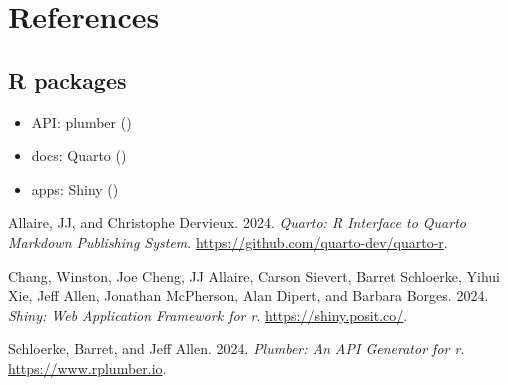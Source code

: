 \documentclass[
  letterpaper,
  DIV=11,
  numbers=noendperiod]{scrreprt}
\newlength{\cslhangindent}
\newenvironment{CSLReferences}[2] %
 {\begin{list}{}{%
  \setlength{\itemindent}{0pt}
  \setlength{\leftmargin}{0pt}
  \setlength{\parsep}{0pt}
  \ifodd #1
   \setlength{\leftmargin}{\cslhangindent}
   \setlength{\itemindent}{-1\cslhangindent}
  \fi
  \setlength{\itemsep}{#2\baselineskip}}}
 {\end{list}}
\providecommand{\tightlist}{%
  \setlength{\itemsep}{0pt}\setlength{\parskip}{0pt}}
\begin{document}

\chapter{References}\label{references}

\section{R packages}\label{r-packages}

\begin{itemize}
\tightlist
\item
  API: plumber ()
\item
  docs: Quarto ()
\item
  apps: Shiny ()
\end{itemize}

\label{refs}
\begin{CSLReferences}{1}{0}
Allaire, JJ, and Christophe Dervieux. 2024. \emph{Quarto: R Interface to
Quarto Markdown Publishing System}.
\url{https://github.com/quarto-dev/quarto-r}.

Chang, Winston, Joe Cheng, JJ Allaire, Carson Sievert, Barret Schloerke,
Yihui Xie, Jeff Allen, Jonathan McPherson, Alan Dipert, and Barbara
Borges. 2024. \emph{Shiny: Web Application Framework for r}.
\url{https://shiny.posit.co/}.

Schloerke, Barret, and Jeff Allen. 2024. \emph{Plumber: An API Generator
for r}. \url{https://www.rplumber.io}.

\end{CSLReferences}
\end{document}
